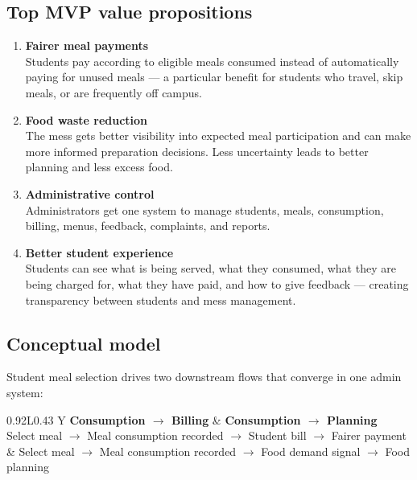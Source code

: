 \documentclass[12pt,a4paper]{article}
\begin{document}
\subsection*{Top MVP value propositions}

\begin{enumerate}
    \item \textbf{Fairer meal payments}\\
    Students pay according to eligible meals consumed instead of automatically
    paying for unused meals --- a particular benefit for students who travel,
    skip meals, or are frequently off campus.

    \item \textbf{Food waste reduction}\\
    The mess gets better visibility into expected meal participation and can
    make more informed preparation decisions. Less uncertainty leads to better
    planning and less excess food.

    \item \textbf{Administrative control}\\
    Administrators get one system to manage students, meals, consumption,
    billing, menus, feedback, complaints, and reports.

    \item \textbf{Better student experience}\\
    Students can see what is being served, what they consumed, what they are
    being charged for, what they have paid, and how to give feedback --- creating
    transparency between students and mess management.
\end{enumerate}

\subsection*{Conceptual model}

Student meal selection drives two downstream flows that converge in one admin
system:

\begin{center}
\begin{tabularx}{0.92\textwidth}{L{0.43\textwidth} Y}
\toprule
\textbf{Consumption $\rightarrow$ Billing} & \textbf{Consumption $\rightarrow$ Planning}\\
\midrule
Select meal $\rightarrow$ Meal consumption recorded $\rightarrow$
Student bill $\rightarrow$ Fairer payment &
Select meal $\rightarrow$ Meal consumption recorded $\rightarrow$
Food demand signal $\rightarrow$ Food planning\\
\bottomrule
\end{tabularx}
\end{center}
\end{document}
